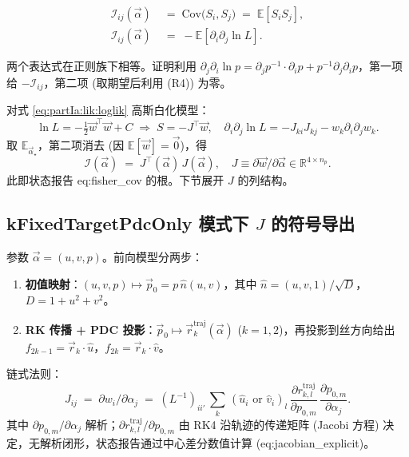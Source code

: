 \begin{definition}\label{def:partIa:fisher}
  \begin{align}
    \mathcal I_{ij}(\vec\alpha) &\;=\; \mathrm{Cov}\bigl(S_i,S_j\bigr) \;=\;\mathbb E[S_iS_j],
      \label{eq:partIa:fisher:def_cov}\\
    \mathcal I_{ij}(\vec\alpha) &\;=\; -\mathbb E\!\left[\partial_i\partial_j\ln L\right].
      \label{eq:partIa:fisher:def_hess}
  \end{align}
\end{definition}

两个表达式在正则族下相等。证明利用 $\partial_j\partial_i\ln p=\partial_jp^{-1}\cdot\partial_ip+p^{-1}\partial_j\partial_ip$，第一项给 $-\mathcal I_{ij}$，第二项 (取期望后利用 (R4)) 为零。

对式 \eqref{eq:partIa:lik:loglik} 高斯白化模型：
\begin{equation}
  \ln L = -\tfrac12\vec w^\top\vec w + C
  \;\Rightarrow\;
  S = -J^\top\vec w,
  \quad
  \partial_i\partial_j\ln L = -J_{ki}J_{kj}-w_k\partial_i\partial_jw_k.
\end{equation}
取 $\mathbb E_{\vec\alpha_\star}$，第二项消去 (因 $\mathbb E[\vec w]=\vec 0$)，得
\begin{equation}
  \boxed{\;\mathcal I(\vec\alpha) \;=\; J^\top(\vec\alpha)\,J(\vec\alpha),\quad J\equiv\partial\vec w/\partial\vec\alpha\in\mathbb R^{4\times n_p}.\;}
  \label{eq:partIa:fisher:JTJ}
\end{equation}
此即状态报告 \StatusReport eq:fisher\_cov 的根。下节展开 $J$ 的列结构。

\subsection{kFixedTargetPdcOnly 模式下 $J$ 的符号导出}
\label{sec:partIa:fisher:Jderiv}

参数 $\vec\alpha=(u,v,p)$。前向模型分两步：
\begin{enumerate}[nosep]
  \item \textbf{初值映射}：$(u,v,p)\mapsto\vec p_0=p\,\hat n(u,v)$，其中 $\hat n=(u,v,1)/\sqrt{D}$，$D=1+u^2+v^2$。
  \item \textbf{RK 传播 + PDC 投影}：$\vec p_0\mapsto\vec r^\mathrm{traj}_k(\vec\alpha)$ ($k=1,2$)，再投影到丝方向给出 $f_{2k-1}=\vec r_k\cdot\hat u$，$f_{2k}=\vec r_k\cdot\hat v$。
\end{enumerate}

链式法则：
\begin{equation}
  J_{ij} \;=\; \partial w_i/\partial\alpha_j
  \;=\; (L^{-1})_{ii'}\,\sum_{k}\,(\hat u_i \text{ or }\hat v_i)_l\,
        \frac{\partial r_{k,l}^\mathrm{traj}}{\partial p_{0,m}}\,\frac{\partial p_{0,m}}{\partial\alpha_j}.
  \label{eq:partIa:fisher:chainrule}
\end{equation}
其中 $\partial p_{0,m}/\partial\alpha_j$ 解析；$\partial r_{k,l}^\mathrm{traj}/\partial p_{0,m}$ 由 RK4 沿轨迹的传递矩阵 (Jacobi 方程) 决定，无解析闭形，状态报告通过中心差分数值计算 (\StatusReport eq:jacobian\_explicit)。

